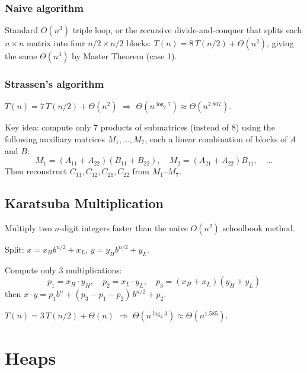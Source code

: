 \documentclass[11pt,a4paper,openany]{book}
\begin{document}
\subsubsection{Naive algorithm}
Standard $O(n^3)$ triple loop, or the recursive divide-and-conquer that splits each
$n \times n$ matrix into four $n/2 \times n/2$ blocks: $T(n) = 8\,T(n/2) + \Theta(n^2)$,
giving the same $\Theta(n^3)$ by Master Theorem (case 1).

\subsubsection{Strassen's algorithm}
\begin{propbox}[title=Complexity]
$T(n) = 7\,T(n/2) + \Theta(n^2)$ $\Rightarrow$ $\Theta(n^{\log_2 7}) \approx \Theta(n^{2.807})$.
\end{propbox}

Key idea: compute only 7 products of submatrices (instead of 8) using the following
auxiliary matrices $M_1, \ldots, M_7$, each a linear combination of blocks of $A$ and $B$:
\[
  M_1 = (A_{11}+A_{22})(B_{11}+B_{22}), \quad
  M_2 = (A_{21}+A_{22})B_{11}, \quad \ldots
\]
Then reconstruct $C_{11}, C_{12}, C_{21}, C_{22}$ from $M_1$--$M_7$.

\subsection{Karatsuba Multiplication}

Multiply two $n$-digit integers faster than the naive $O(n^2)$ schoolbook method.

Split: $x = x_H b^{n/2} + x_L$, $y = y_H b^{n/2} + y_L$.

Compute only 3 multiplications:
\[
  p_1 = x_H \cdot y_H, \quad
  p_2 = x_L \cdot y_L, \quad
  p_3 = (x_H + x_L)(y_H + y_L)
\]
then $x \cdot y = p_1 b^n + (p_3 - p_1 - p_2)\,b^{n/2} + p_2$.

\begin{propbox}[title=Complexity]
$T(n) = 3\,T(n/2) + \Theta(n)$ $\Rightarrow$ $\Theta(n^{\log_2 3}) \approx \Theta(n^{1.585})$.
\end{propbox}

\section{Heaps}
\end{document}
